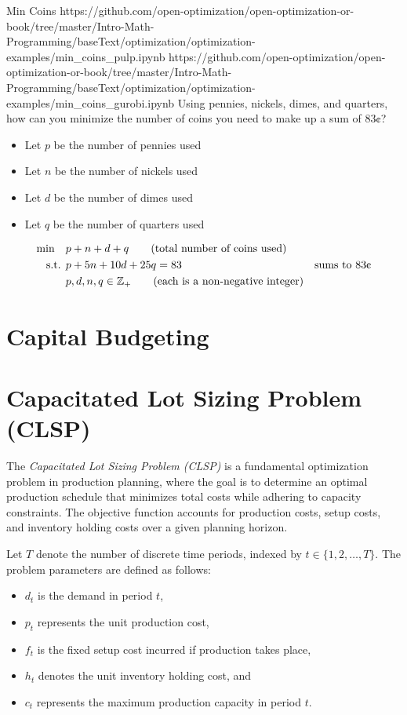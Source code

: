 \begin{examplewithallcode}{Min Coins}
{}
{https://github.com/open-optimization/open-optimization-or-book/tree/master/Intro-Math-Programming/baseText/optimization/optimization-examples/min_coins_pulp.ipynb}
{https://github.com/open-optimization/open-optimization-or-book/tree/master/Intro-Math-Programming/baseText/optimization/optimization-examples/min_coins_gurobi.ipynb}
\label{ex:min-coins}
Using pennies, nickels, dimes, and quarters, how can you minimize the number of coins you need to make up a sum of $83\cent$? 

\begin{itemize}
\item Let $p$ be the number of pennies used
\item Let $n$ be the number of nickels used
\item Let $d$ be the number of dimes used
\item Let $q$ be the number of quarters used
\end{itemize}
\begin{align*}
\min \quad & p + n + d + q   \tag{total number of coins used} \\
\st        & p + 5n + 10d + 25 q = 83 & \text{sums to } 83 \cent \\
& p,d,n,q \in \Z_+   \tag{each is a non-negative integer}
\end{align*}
\end{examplewithallcode}

\section{Capital Budgeting}
\label{sec:capital-budgeting}



\section{Capacitated Lot Sizing Problem (CLSP)}

The \textit{Capacitated Lot Sizing Problem (CLSP)} is a fundamental optimization problem in production planning, where the goal is to determine an optimal production schedule that minimizes total costs while adhering to capacity constraints. The objective function accounts for production costs, setup costs, and inventory holding costs over a given planning horizon.

Let \( T \) denote the number of discrete time periods, indexed by \( t \in \{1,2,\dots,T\} \). The problem parameters are defined as follows:
\begin{itemize}
    \item \( d_t \) is the demand in period \( t \),
    \item \( p_t \) represents the unit production cost,
    \item \( f_t \) is the fixed setup cost incurred if production takes place,
    \item \( h_t \) denotes the unit inventory holding cost, and
    \item \( c_t \) represents the maximum production capacity in period \( t \).
\end{itemize}


